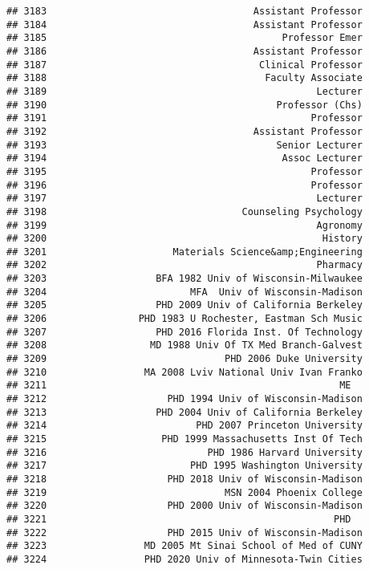 \documentclass[
]{article}
\begin{document}
\begin{verbatim}
## 3183                                    Assistant Professor
## 3184                                    Assistant Professor
## 3185                                         Professor Emer
## 3186                                    Assistant Professor
## 3187                                     Clinical Professor
## 3188                                      Faculty Associate
## 3189                                               Lecturer
## 3190                                        Professor (Chs)
## 3191                                              Professor
## 3192                                    Assistant Professor
## 3193                                        Senior Lecturer
## 3194                                         Assoc Lecturer
## 3195                                              Professor
## 3196                                              Professor
## 3197                                               Lecturer
## 3198                                  Counseling Psychology
## 3199                                               Agronomy
## 3200                                                History
## 3201                      Materials Science&amp;Engineering
## 3202                                               Pharmacy
## 3203                   BFA 1982 Univ of Wisconsin-Milwaukee
## 3204                         MFA  Univ of Wisconsin-Madison
## 3205                   PHD 2009 Univ of California Berkeley
## 3206                PHD 1983 U Rochester, Eastman Sch Music
## 3207                   PHD 2016 Florida Inst. Of Technology
## 3208                  MD 1988 Univ Of TX Med Branch-Galvest
## 3209                               PHD 2006 Duke University
## 3210                 MA 2008 Lviv National Univ Ivan Franko
## 3211                                                   ME  
## 3212                     PHD 1994 Univ of Wisconsin-Madison
## 3213                   PHD 2004 Univ of California Berkeley
## 3214                          PHD 2007 Princeton University
## 3215                    PHD 1999 Massachusetts Inst Of Tech
## 3216                            PHD 1986 Harvard University
## 3217                         PHD 1995 Washington University
## 3218                     PHD 2018 Univ of Wisconsin-Madison
## 3219                               MSN 2004 Phoenix College
## 3220                     PHD 2000 Univ of Wisconsin-Madison
## 3221                                                  PHD  
## 3222                     PHD 2015 Univ of Wisconsin-Madison
## 3223                 MD 2005 Mt Sinai School of Med of CUNY
## 3224                 PHD 2020 Univ of Minnesota-Twin Cities

\end{verbatim}
\end{document}
